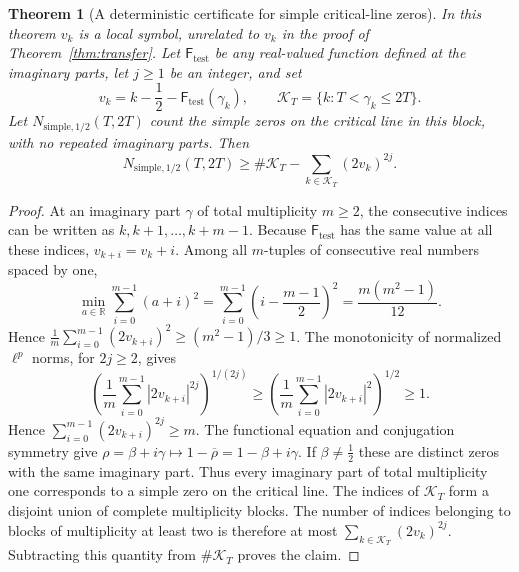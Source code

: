 \documentclass[11pt,a4paper]{article}
\makeatletter
\numberwithin{equation}{section}
\DeclareRobustCommand{\CGref}[1]{\ref{#1}}
\let\CG@origref\ref
\newcommand{\CG@gettip}[1]{\@ifundefined{CGTip@#1}{#1}{\csname CGTip@#1\endcsname}}
\DeclareRobustCommand{\CGref}[1]{\pdftooltip{\CG@origref{#1}}{\CG@gettip{#1}}}
\newtheorem{theorem}{Theorem}[section]
\theoremstyle{definition}
\theoremstyle{remark}
\makeatother
\begin{document}
\begin{theorem}[A deterministic certificate for simple critical-line zeros]\label{thm:recovered_simple_certificate}
In this theorem $v_k$ is a local symbol, unrelated to $v_k$ in the proof of Theorem~\CGref{thm:transfer}. Let $\mathsf F_{\mathrm{test}}$ be any real-valued function defined at the imaginary parts,
let $j\ge1$ be an integer, and set
\begin{equation}
v_k=k-\frac12-\mathsf F_{\mathrm{test}}(\gamma_k),\qquad
\mathcal K_T=\{k:T<\gamma_k\le2T\}.
\label{eq:disp_46}
\end{equation}
Let $N_{\mathrm{simple},1/2}(T,2T)$ count the simple zeros on the
critical line in this block, with no repeated imaginary parts. Then
\begin{equation}
N_{\mathrm{simple},1/2}(T,2T)
\ge\#\mathcal K_T-\sum_{k\in\mathcal K_T}(2v_k)^{2j}.
\label{eq:recovered_simple_certificate}
\end{equation}
\end{theorem}
\begin{proof}
At an imaginary part $\gamma$ of total multiplicity $m\ge2$, the consecutive
indices can be written as $k,k+1,\ldots,k+m-1$. Because $\mathsf F_{\mathrm{test}}$ has the
same value at all these indices, $v_{k+i}=v_k+i$.
Among all $m$-tuples of consecutive real numbers spaced by one,
\begin{equation}
\min_{a\in\mathbb R}\sum_{i=0}^{m-1}(a+i)^2
=\sum_{i=0}^{m-1}\left(i-\frac{m-1}{2}\right)^2
=\frac{m(m^2-1)}{12}.
\label{eq:disp_47}
\end{equation}
Hence
$\frac1m\sum_{i=0}^{m-1}(2v_{k+i})^2\ge(m^2-1)/3\ge1$.
The monotonicity of normalized $\ell^p$ norms, for $2j\ge2$, gives
\begin{equation}
\left(\frac1m\sum_{i=0}^{m-1}|2v_{k+i}|^{2j}\right)^{1/(2j)}
\ge\left(\frac1m\sum_{i=0}^{m-1}|2v_{k+i}|^2\right)^{1/2}\ge1.
\label{eq:disp_48}
\end{equation}
Hence $\sum_{i=0}^{m-1}(2v_{k+i})^{2j}\ge m$.
The functional equation and conjugation symmetry give
$\rho=\beta+i\gamma\mapsto1-\overline\rho=1-\beta+i\gamma$.
If $\beta\ne\frac12$ these are distinct zeros with the same imaginary part.
Thus every imaginary part of total multiplicity one corresponds to a simple
zero on the critical line.
The indices of $\mathcal K_T$ form a disjoint union of complete
multiplicity blocks. The number of indices belonging to blocks of
multiplicity at least two is therefore at most
$\sum_{k\in\mathcal K_T}(2v_k)^{2j}$.
Subtracting this quantity from $\#\mathcal K_T$ proves the claim.
\end{proof}
\end{document}
